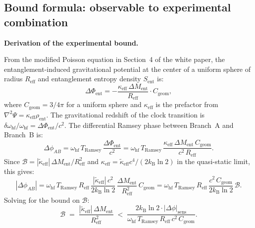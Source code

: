 \documentclass[12pt,letterpaper]{article}
\theoremstyle{plain}
\theoremstyle{definition}
\newcommand{\kB}{k_{\mathrm{B}}}
\newcommand{\kteff}{\tilde{\kappa}_{\mathrm{eff}}}
\newcommand{\Sent}{S_{\mathrm{ent}}}
\newcommand{\Ment}{M_{\mathrm{ent}}}
\newcommand{\Bobs}{\mathcal{B}}
\begin{document}
\subsection{Bound formula: observable to experimental combination}

\begin{keybox}
\textbf{Derivation of the experimental bound.}

From the modified Poisson equation in Section~4 of the white paper, the entanglement-induced gravitational potential at the center of a uniform sphere of radius $R_{\mathrm{eff}}$ and entanglement entropy density $\Sent$ is:
\begin{equation}
  \Delta\Phi_{\mathrm{ent}}
  = -\frac{\kappa_{\mathrm{eff}}\,\Delta\Ment}{R_{\mathrm{eff}}}\cdot C_{\mathrm{geom}},
  \label{eq:Phi-ent}
\end{equation}
where $C_{\mathrm{geom}} = 3/4\pi$ for a uniform sphere and $\kappa_{\mathrm{eff}}$ is the prefactor from $\nabla^2\Psi = \kappa_{\mathrm{eff}}\rho_{\mathrm{ent}}$.  The gravitational redshift of the clock transition is $\delta\omega_{\mathrm{hf}}/\omega_{\mathrm{hf}} = \Delta\Phi_{\mathrm{ent}}/c^2$.  The differential Ramsey phase between Branch~A and Branch~B is:
\begin{equation}
  \Delta\phi_{AB}
  = \omega_{\mathrm{hf}}\,T_{\mathrm{Ramsey}}\,
    \frac{\Delta\Phi_{\mathrm{ent}}}{c^2}
  = \omega_{\mathrm{hf}}\,T_{\mathrm{Ramsey}}\,
    \frac{\kappa_{\mathrm{eff}}\,\Delta\Ment\,C_{\mathrm{geom}}}{c^2\,R_{\mathrm{eff}}}.
  \label{eq:phase-formula}
\end{equation}
Since $\Bobs = |\kteff|\,\Delta\Ment/R_{\mathrm{eff}}^2$ and $\kappa_{\mathrm{eff}} = \kteff c^4/(2\kB\ln 2)$ in the quasi-static limit, this gives:
\begin{equation}
  |\Delta\phi_{AB}|
  = \omega_{\mathrm{hf}}\,T_{\mathrm{Ramsey}}\,R_{\mathrm{eff}}\,
    \frac{|\kteff|\,c^2}{2\kB\ln 2}\,
    \frac{\Delta\Ment}{R_{\mathrm{eff}}^2}\,C_{\mathrm{geom}}
  = \omega_{\mathrm{hf}}\,T_{\mathrm{Ramsey}}\,R_{\mathrm{eff}}\,
    \frac{c^2\,C_{\mathrm{geom}}}{2\kB\ln 2}\,\Bobs.
\end{equation}
Solving for the bound on $\Bobs$:
\begin{equation}
  \boxed{
  \Bobs
  \;=\;
  \frac{|\kteff|\,\Delta\Ment}{R_{\mathrm{eff}}^2}
  \;<\;
  \frac{2\kB\ln 2 \cdot |\Delta\phi|_{\mathrm{sens}}}
       {\omega_{\mathrm{hf}}\,T_{\mathrm{Ramsey}}\,R_{\mathrm{eff}}\,c^2\,C_{\mathrm{geom}}}.
  }
  \label{eq:bound}
\end{equation}


\end{keybox}
\end{document}
